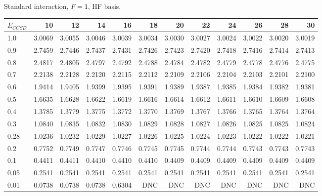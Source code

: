 \begin{landscape}
\begin{table}
\begin{center}
\begin{tabular}{l|rrrrrrrrrrrr}
\end{tabular} 
\end{center}
\begin{center}
Standard interaction, $F=1$, HF basis.\\
\begin{tabular}{l|rrrrrrrrrrr}
\hline 
$E_{CCSD}$ & 10 & 12 & 14 & 16 & 18 & 20 & 22 & 24 & 26 & 28 & 30 \\
\hline \hline
1.0 & 3.0069 & 3.0055 & 3.0046 & 3.0039 & 3.0034 & 3.0030 & 3.0027 & 3.0024 & 3.0022 & 3.0020 & 3.0019  \\ 
0.9 & 2.7459 & 2.7446 & 2.7437 & 2.7431 & 2.7426 & 2.7423 & 2.7420 & 2.7418 & 2.7416 & 2.7414 & 2.7413  \\ 
0.8 & 2.4817 & 2.4805 & 2.4797 & 2.4792 & 2.4788 & 2.4784 & 2.4782 & 2.4779 & 2.4778 & 2.4776 & 2.4775  \\ 
0.7 & 2.2138 & 2.2128 & 2.2120 & 2.2115 & 2.2112 & 2.2109 & 2.2106 & 2.2104 & 2.2103 & 2.2101 & 2.2100  \\ 
0.6 & 1.9414 & 1.9405 & 1.9399 & 1.9395 & 1.9391 & 1.9389 & 1.9387 & 1.9385 & 1.9384 & 1.9382 & 1.9381  \\ 
0.5 & 1.6635 & 1.6628 & 1.6622 & 1.6619 & 1.6616 & 1.6614 & 1.6612 & 1.6611 & 1.6610 & 1.6609 & 1.6608  \\ 
0.4 & 1.3785 & 1.3779 & 1.3775 & 1.3772 & 1.3770 & 1.3769 & 1.3767 & 1.3766 & 1.3765 & 1.3764 & 1.3764  \\ 
0.3 & 1.0840 & 1.0835 & 1.0832 & 1.0830 & 1.0829 & 1.0828 & 1.0827 & 1.0826 & 1.0825 & 1.0825 & 1.0824  \\ 
0.28 & 1.0236 & 1.0232 & 1.0229 & 1.0227 & 1.0226 & 1.0225 & 1.0224 & 1.0223 & 1.0222 & 1.0222 & 1.0221  \\ 
0.2 & 0.7752 & 0.7749 & 0.7747 & 0.7746 & 0.7745 & 0.7745 & 0.7744 & 0.7744 & 0.7743 & 0.7743 & 0.7743  \\ 
0.1 & 0.4411 & 0.4411 & 0.4410 & 0.4410 & 0.4410 & 0.4409 & 0.4409 & 0.4409 & 0.4409 & 0.4409 & 0.4409  \\ 
0.05 & 0.2541 & 0.2541 & 0.2541 & 0.2541 & 0.2541 & 0.2541 & 0.2541 & 0.2541 & 0.2541 & 0.2541 & 0.2541  \\ 
0.01 & 0.0738 & 0.0738 & 0.0738 & 0.6304 & DNC & DNC & DNC & DNC & DNC & DNC & DNC  \\ 
\hline \hline
\end{tabular}
\end{center}
\end{table}
\end{landscape}


